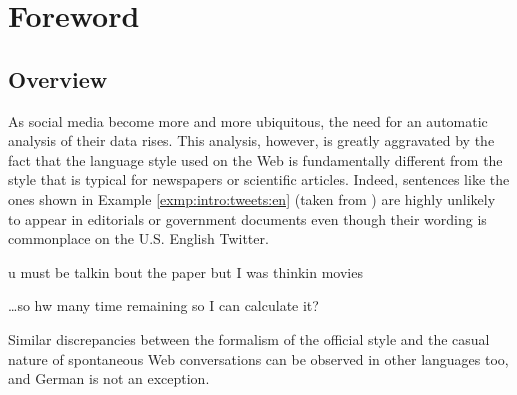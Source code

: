 

\chapter{Foreword}

\section{Overview}
As social media become more and more ubiquitous, the need for an
automatic analysis of their data rises.  This analysis, however, is
greatly aggravated by the fact that the language style used on the Web
is fundamentally different from the style that is typical for
newspapers or scientific articles.  Indeed, sentences like the ones
shown in Example \ref{exmp:intro:tweets:en} (taken from
\citet{HanBaldwin:11}) are highly unlikely to appear in editorials or
government documents even though their wording is commonplace on the
U.S. English Twitter.
\begin{example}\label{exmp:intro:tweets:en}
u must be talkin bout the paper but I was thinkin movies

\dots so hw many time remaining so I can calculate it?
\end{example}
Similar discrepancies between the formalism of the official style and the
casual nature of spontaneous Web conversations can be observed in other
languages too, and German is not an exception.

